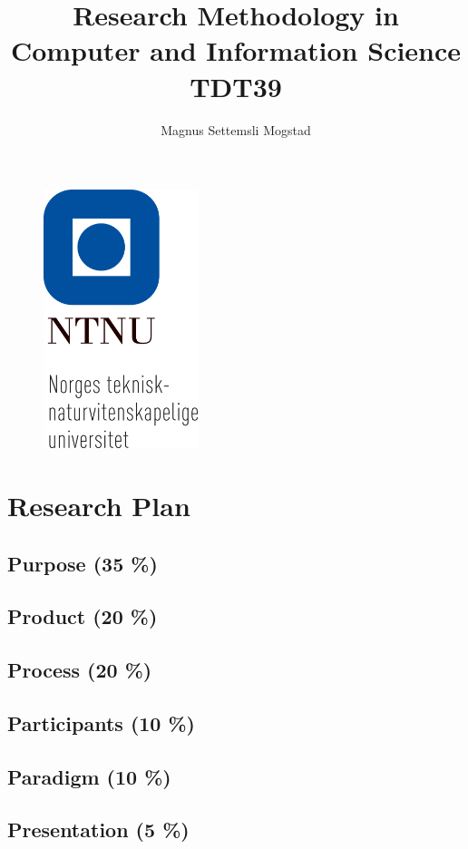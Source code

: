 \documentclass[12pt,runningheads]{article}
\begin{document}
\title{Research Methodology in Computer and Information Science \\ \small TDT39}
\author{Magnus Settemsli Mogstad}
\date{\vspace{-5ex}}
\maketitle
\begin{figure}[h!]
	\centering
    \includegraphics[width=0.4\textwidth]{ntnu_hele_navnet_staaende_bm.png}
\end{figure}

\pagebreak


\section*{Research Plan}

\subsection*{Purpose (35 \%)}
\subsection*{Product (20 \%)}
\subsection*{Process (20 \%)}
\subsection*{Participants (10 \%)}
\subsection*{Paradigm (10 \%)}
\subsection*{Presentation (5 \%)}





\printbibliography
\end{document}
